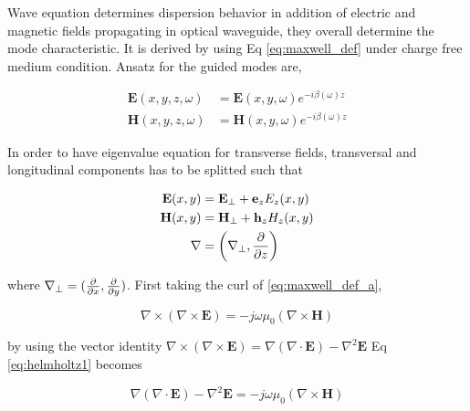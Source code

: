 \documentclass[thesis]{deutez}
\begin{document}
    Wave equation determines dispersion behavior in addition of electric and magnetic fields propagating in optical waveguide, they overall determine the mode characteristic. It is derived by using Eq \ref{eq:maxwell_def} under charge free medium condition. Ansatz for the guided modes are, 

    \begin{subequations}\label{eq:eigenval_eq}
        \begin{align}
            \mathbf{E}(x,y,z,\omega) &= \mathbf{E}(x,y,\omega)e^{-i\beta(\omega)z} \label{eq:ansatz_e} \\
            \mathbf{H}(x,y,z,\omega) &= \mathbf{H}(x,y,\omega)e^{-i\beta(\omega)z} \label{eq:ansatz_h}  
        \end{align}
    \end{subequations}
    
    In order to have eigenvalue equation for transverse fields, transversal and longitudinal components has to be splitted such that

    \begin{subequations}\label{eq:trans-longi_splitting}
        \begin{align}
            \mathbf{E}(x,y) &= \mathbf{E_{\perp}} + \mathbf{e}_z E_z(x,y) \label{eq:splitting_e} \\
            \mathbf{H}(x,y) &= \mathbf{H_{\perp}} + \mathbf{h}_z H_z(x,y) \label{eq:splitting_h} \\
             \mathbf{\nabla} &= \left( \nabla_{\perp}, \pdv{}{z} \right) 
        \end{align}
    \end{subequations}

    where $\nabla_{\perp} = (\pdv{}{x},\pdv{}{y}) $. First taking the curl of \ref{eq:maxwell_def_a}, 

    \begin{equation}
        \nabla \times (\nabla \times \mathbf{E}) = -j\omega \mu_0  (\nabla \times \mathbf{H})
        \label{eq:helmholtz1}
    \end{equation}

    by using the vector identity $\nabla \times (\nabla \times \mathbf{E}) = \nabla(\nabla \cdot \mathbf{E}) - \nabla^2 \mathbf{E}$ Eq \ref{eq:helmholtz1} becomes 

    \begin{equation}
        \nabla(\nabla \cdot \mathbf{E}) - \nabla^2 \mathbf{E} = -j\omega\mu_0 (\nabla \times \mathbf{H})
        \label{eq:helmholtz_vector_identity}
    \end{equation}
\end{document}

